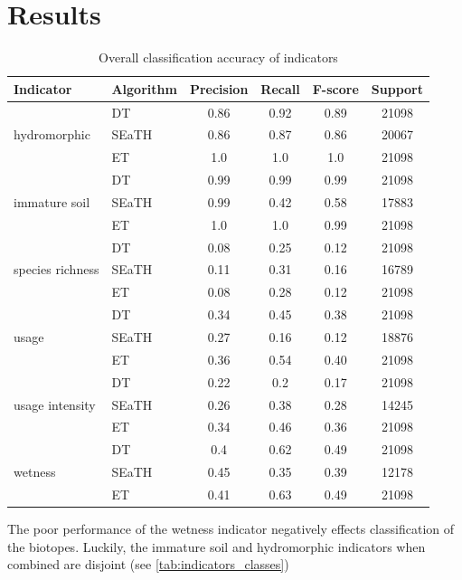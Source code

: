 \documentclass[authoryear,final,12pt,number]{elsarticle}
\begin{document}
\section{Results}
\begin{table}
    \centering
    \begin{tabular}{l l c c c c}
    Indicator & Algorithm & Precision & Recall & F-score & 
    Support\\
    \hline
    \multirow{3}{*}{hydromorphic}
    & DT & 0.86 & 0.92 & 0.89 & 21098\\
    & SEaTH & 0.86 & 0.87 & 0.86 & 20067\\
    & ET & 1.0 & 1.0 & 1.0 & 21098\\
    \cline{2-6}
    \multirow{3}{*}{immature soil}
    & DT & 0.99 & 0.99 & 0.99 & 21098\\
    & SEaTH & 0.99 & 0.42 & 0.58 & 17883\\
    & ET & 1.0 & 1.0 & 0.99 & 21098\\
    \cline{2-6}
    \multirow{3}{*}{species richness}
    & DT & 0.08 & 0.25 & 0.12 & 21098\\
    & SEaTH & 0.11 & 0.31 & 0.16 & 16789\\
    & ET & 0.08 & 0.28 & 0.12 & 21098\\
    \cline{2-6}
    \multirow{3}{*}{usage}
    & DT & 0.34 & 0.45 & 0.38 & 21098\\
    & SEaTH & 0.27 & 0.16 & 0.12 & 18876\\
    & ET & 0.36 & 0.54 & 0.40 & 21098\\
    \cline{2-6}
    \multirow{3}{*}{usage intensity}
    & DT & 0.22 & 0.2 & 0.17 & 21098\\
    & SEaTH & 0.26 & 0.38 & 0.28 & 14245\\
    & ET & 0.34 & 0.46 & 0.36 & 21098\\
    \cline{2-6}
    \multirow{3}{*}{wetness}
    & DT & 0.4 & 0.62 & 0.49 & 21098\\
    & SEaTH & 0.45 & 0.35 & 0.39 & 12178\\
    & ET & 0.41 & 0.63 & 0.49 & 21098\\
    \end{tabular}
    \caption{Overall classification accuracy of 
indicators\label{tab:accuracy_indicators}}
\end{table}
The poor performance of the wetness indicator negatively effects classification 
of the
biotopes. Luckily, the immature soil and hydromorphic indicators when combined
are disjoint (see \ref{tab:indicators_classes})
\end{document}
